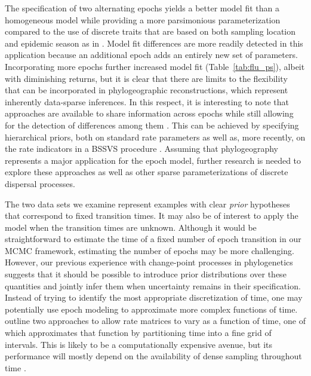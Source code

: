 The specification of two alternating epochs yields a better model fit than a homogeneous model while providing a more parsimonious parameterization compared to the use of discrete traits that are based on both sampling location and epidemic season as in \citet{Bahl2011}.
Model fit differences are more readily detected in this application because an additional epoch adds an entirely new set of parameters.
Incorporating more epochs further increased model fit (Table~\ref{tab:flu_ps}), albeit with diminishing returns, but it is clear that there are limits to the flexibility that can be incorporated in phylogeographic reconstructions, which represent inherently data-sparse inferences.
In this respect, it is interesting to note that approaches are available to share information across epochs while still allowing for the detection of differences among them \citep{Suchard2003b}.
This can be achieved by specifying hierarchical priors, both on standard rate parameters \citep{Edo-Matas2011} as well as, more recently, on the rate indicators in a BSSVS procedure \citep{Cybis2013}.
Assuming that phylogeography represents a major application for the epoch model, further research is needed to explore these approaches as well as other sparse parameterizations of discrete dispersal processes.

The two data sets we examine represent examples with clear \textit{prior} hypotheses that correspond to fixed transition times.
It may also be of interest to apply the model when the transition times are unknown. 
Although it would be straightforward to estimate the time of a fixed number of epoch transition in our MCMC framework, estimating the number of epochs may be more challenging.
However, our previous experience with change-point processes in phylogenetics \citep{Suchard2003a} suggests that it should be possible to introduce prior distributions over these quantities and jointly infer them when uncertainty remains in their specification.
Instead of trying to identify the most appropriate discretization of time, one may potentially use epoch modeling to approximate more complex functions of time.
\citet{Rodrigo2008} outline two approaches to allow rate matrices to vary as a function of time, one of which approximates that function by partitioning time into a fine grid of intervals.
This is likely to be a computationally expensive avenue, but its performance will mostly depend on the availability of dense sampling throughout time \citep{Rodrigo2008}.%

